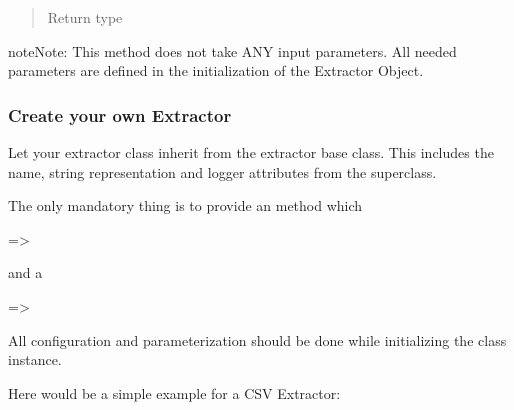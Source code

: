 \documentclass[a4paper,10pt, twoside,english]{sphinxmanual}
\begin{document}
\begin{fulllineitems}
\begin{fulllineitems}
\begin{quote}
\begin{description}
\item[{Return type}] \leavevmode
{}

\end{description}\end{quote}

\begin{sphinxadmonition}{note}{Note:}
This method does not take ANY input parameters. All needed parameters are defined
in the initialization of the Extractor Object.
\end{sphinxadmonition}

\end{fulllineitems}


\end{fulllineitems}



\subsubsection{Create your own Extractor}
\label{\detokenize{base_classes/extractor:create-your-own-extractor}}\label{\detokenize{base_classes/extractor:custom-extractor}}
Let your extractor class inherit from the extractor base class.
This includes the name, string representation and logger attributes from the superclass.

\begin{DUlineblock}{0em}
\item[] The only mandatory thing is to provide an  method which
\item[] 
\item[] =\textgreater{} 
\item[] and  a
\item[] =\textgreater{} 
\end{DUlineblock}

All configuration and parameterization should be done while initializing the class instance.

Here would be a simple example for a CSV Extractor:
\end{document}
